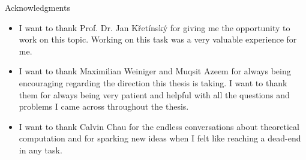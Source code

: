\thispagestyle{empty}

\vspace*{20mm}

\begin{center}
{ Acknowledgments}
\end{center}

\vspace{10mm}

\begin{itemize}
	\item I want to thank Prof. Dr. Jan K\v{r}et\'{i}nsk\'{y} for giving me the opportunity to work on this topic. Working on this task was a very valuable experience for me.
	\item I want to thank Maximilian Weiniger and Muqsit Azeem for always being encouraging regarding the direction this thesis is taking. I want to thank them for always being very patient and helpful with all the questions and problems I came across throughout the thesis.
	\item I want to thank Calvin Chau for the endless conversations about theoretical computation and for sparking new ideas when I felt like reaching a dead-end in any task.
\end{itemize}

\cleardoublepage{}
